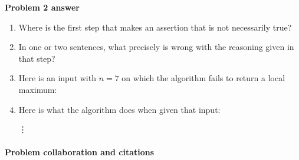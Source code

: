 \textbf{Problem 2 answer} 

\begin{enumerate}[label=(\alph*)]

\item[(a)]
  Where is the first step that makes an assertion that is not necessarily true?

  
\item[(b)]
  In one or two sentences, what precisely is wrong with the reasoning given in that step?

  \begin{blue}
    \REPLACEME
  \end{blue}

\item[(c)]
  Here is an input with $n=7$ on which the algorithm fails to return a local maximum:


\item[]
  Here is what the algorithm does when given that input:
  \begin{blue}
    \begin{steps}
      \step \REPLACEME
      \step \REPLACEME
      
      \vdots
    \end{steps}
  \end{blue}
  
\end{enumerate}


\newpage


\paragraph{Problem  collaboration and citations}~

